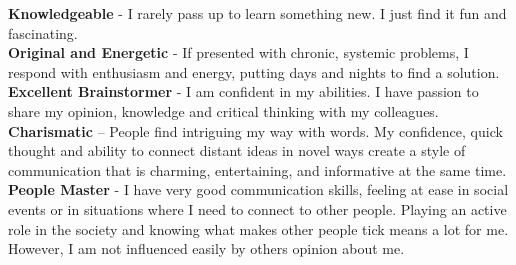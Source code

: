 \textbf{Knowledgeable} - I rarely pass up to learn something
new. I just find it fun and fascinating.\\
\textbf{Original and Energetic} - If presented with chronic, systemic
problems, I respond with enthusiasm and energy, putting days and nights to find a solution.\\
\textbf{Excellent Brainstormer} - I am confident in my abilities. I
have passion to share my opinion, knowledge and critical thinking with my colleagues.\\
\textbf{Charismatic} – People find intriguing my way with words. My confidence, quick thought and ability to connect distant ideas in novel ways create a style of communication that is charming, entertaining, and informative at the same time.\\
\textbf{People Master} - I have very good communication skills, feeling at ease in social events or in situations where I need to connect to other people. Playing an active role in the society and knowing what makes other people tick means a lot for me. However, I am not influenced easily by others opinion about me.



